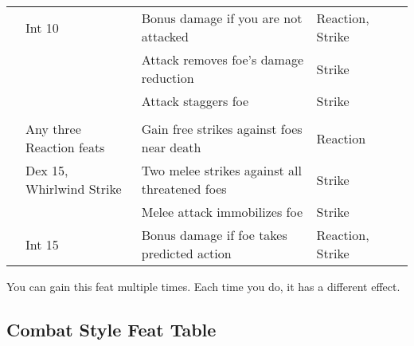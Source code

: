 \begin{longtabuwrapper}
\begin{longtabu}{>{\lcol}p{10em} >{\lcol}p{15em} >{\lcol}X >{\lcol}p{8em} >{\lcol}p{3em}}
         & Int 10 & Bonus damage if you are not attacked & Reaction, Strike &  \\
         & \x & Attack removes foe's damage reduction & Strike &  \\
         & \x & Attack staggers foe & Strike &  \\

        \midrule
         &  &  &  &  \\
         & Any three Reaction feats & Gain free strikes against foes near death & Reaction &  \\
         & Dex 15, Whirlwind Strike & Two melee strikes against all threatened foes & Strike &  \\
         & \x & Melee attack immobilizes foe & Strike &  \\
         & Int 15 & Bonus damage if foe takes predicted action & Reaction, Strike &  \\
    \end{longtabu}
    \begin{enumerate*}
        \item You can gain this feat multiple times.
            Each time you do, it has a different effect.
    \end{enumerate*}
\end{longtabuwrapper}

\subsection{Combat Style Feat Table}

